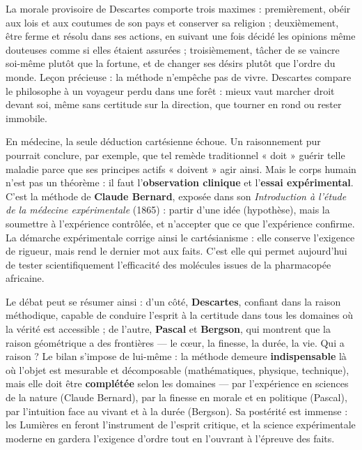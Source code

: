 \documentclass[11pt]{article}
\newcounter{popsec}
\newcounter{popsub}
\newcommand{\courssub}[1]{%
  \stepcounter{popsub}%
  \par\vspace{9pt}\noindent{\popxbold\fontsize{11.5}{13}\selectfont\color{popink}{\color{poporange}\thepopsec.\thepopsub}\hspace{6pt}#1}\par\nopagebreak\vspace{4pt}
}
\begin{document}
\begin{savaistu}
La morale provisoire de Descartes comporte trois maximes : premièrement, obéir aux lois et aux coutumes de son pays et conserver sa religion ; deuxièmement, être ferme et résolu dans ses actions, en suivant une fois décidé les opinions même douteuses comme si elles étaient assurées ; troisièmement, tâcher de se vaincre soi-même plutôt que la fortune, et de changer ses désirs plutôt que l'ordre du monde. Leçon précieuse : la méthode n'empêche pas de vivre. Descartes compare le philosophe à un voyageur perdu dans une forêt : mieux vaut marcher droit devant soi, même sans certitude sur la direction, que tourner en rond ou rester immobile.
\end{savaistu}

\begin{exemplebox}
En médecine, la seule déduction cartésienne échoue. Un raisonnement pur pourrait conclure, par exemple, que tel remède traditionnel « doit » guérir telle maladie parce que ses principes actifs « doivent » agir ainsi. Mais le corps humain n'est pas un théorème : il faut l'\textbf{observation clinique} et l'\textbf{essai expérimental}. C'est la méthode de \textbf{Claude Bernard}, exposée dans son \emph{Introduction à l'étude de la médecine expérimentale} (1865) : partir d'une idée (hypothèse), mais la soumettre à l'expérience contrôlée, et n'accepter que ce que l'expérience confirme. La démarche expérimentale corrige ainsi le cartésianisme : elle conserve l'exigence de rigueur, mais rend le dernier mot aux faits. C'est elle qui permet aujourd'hui de tester scientifiquement l'efficacité des molécules issues de la pharmacopée africaine.
\end{exemplebox}

\courssub{Confrontation finale et bilan}

Le débat peut se résumer ainsi : d'un côté, \textbf{Descartes}, confiant dans la raison méthodique, capable de conduire l'esprit à la certitude dans tous les domaines où la vérité est accessible ; de l'autre, \textbf{Pascal} et \textbf{Bergson}, qui montrent que la raison géométrique a des frontières — le cœur, la finesse, la durée, la vie. Qui a raison ? Le bilan s'impose de lui-même : la méthode demeure \textbf{indispensable} là où l'objet est mesurable et décomposable (mathématiques, physique, technique), mais elle doit être \textbf{complétée} selon les domaines — par l'expérience en sciences de la nature (Claude Bernard), par la finesse en morale et en politique (Pascal), par l'intuition face au vivant et à la durée (Bergson). Sa postérité est immense : les Lumières en feront l'instrument de l'esprit critique, et la science expérimentale moderne en gardera l'exigence d'ordre tout en l'ouvrant à l'épreuve des faits.
\end{document}
